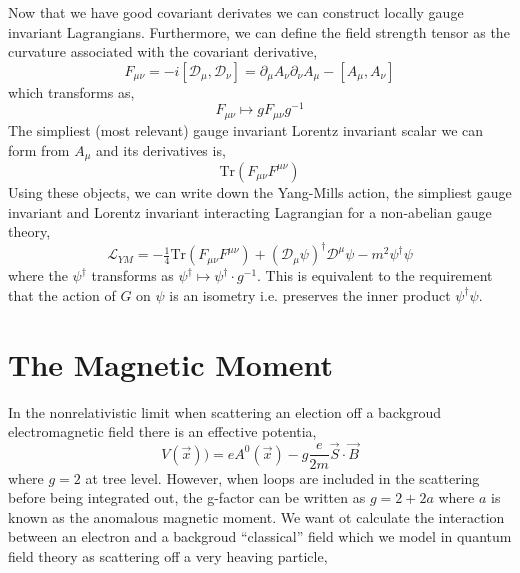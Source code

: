 \documentclass[12pt]{extarticle}
\newcommand{\lagrange}{\mathcal{L}}
\newcommand{\Tr}[1]{\mathrm{Tr}\left( #1 \right)}
\theoremstyle{definition}
\begin{document}
Now that we have good covariant derivates we can construct locally gauge invariant Lagrangians. Furthermore, we can define the field strength tensor as the curvature associated with the covariant derivative,
\[ F_{\mu \nu} = - i [ \mathcal{D}_\mu, \mathcal{D}_\nu ]  =\partial_\mu A_{\nu} \partial_{\nu} A_\mu - [ A_{\mu}, A_{\nu}] \]
which transforms as,
\[ F_{\mu \nu} \mapsto g F_{\mu \nu} g^{-1} \]
The simpliest (most relevant) gauge invariant Lorentz invariant scalar we can form from $A_\mu$ and its derivatives is,
\[ \Tr{F_{\mu \nu} F^{\mu \nu}} \]
Using these objects, we can write down the Yang-Mills action, the simpliest gauge invariant and Lorentz invariant interacting Lagrangian for a non-abelian gauge theory,
\[ \lagrange_{YM} = - \tfrac{1}{4} \Tr{F_{\mu \nu} F^{\mu \nu}} + \left( \mathcal{D}_\mu \psi \right)^\dagger \mathcal{D}^\mu \psi - m^2 \psi^\dagger \psi \]
where the $\psi^\dagger$ transforms as $\psi^\dagger \mapsto \psi^\dagger \cdot g^{-1}$. This is equivalent to the requirement that the action of $G$ on $\psi$ is an isometry i.e. preserves the inner product $\psi^{\dagger} \psi$.

\section{The Magnetic Moment}

In the nonrelativistic limit when scattering an election off a backgroud electromagnetic field there is an effective potentia,
\[ V(\vec{x})) = e A^0(\vec{x}) - g \frac{e}{2m} \vec{S} \cdot \vec{B} \]
where $g = 2$ at tree level. However, when loops are included in the scattering before being integrated out, the g-factor can be written as $g = 2 + 2 a$ where $a$ is known as the anomalous magnetic moment. We want ot calculate the interaction between an electron and a backgroud ``classical'' field which we model in quantum field theory as scattering off a very heaving particle, 

  
\end{document}
